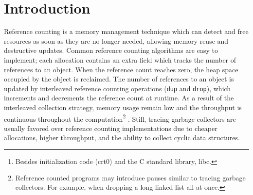 \documentclass[9pt, twocolumn]{article}
\begin{document}
\begin{abstract}
Precise reference counting is a technique by \citeauthor{reinking2021} that uses ownership to deallocate objects as soon as possible. 
The algorithm is called Perceus, and as of this writing, it has only been impl\-emented for eager functional languages.
This paper describes the implementation of a new lazy compiler backend for the Agda programming lang\-uage with precise reference counting.
The compiler uses \citeauthor{johnsson1991} and \citeauthor{boquist1999}'s intermediate language GRIN to compile lazy programs. 
GRIN uses an inter\-procedural \mbox{points-to} analysis to inline the evaluation of suspended computations.
We extend GRIN with a variant of Perceus, and demonstrate the applic\-ability of combining lazy functional programming with precise reference counting by developing a GRIN interpreter and an LLVM IR code generator. 
  Due to GRIN and reference counting, our compiler does not require an external runtime system%
\footnote{Besides initialization code (crt0) and the C standard library, libc.}%
 , which is uncommon for lazy functional languages.%

\end{abstract}

\section{Introduction}

Reference counting \citep{collins1960} is a memory management technique which can detect and free resources as soon as they are no longer needed, allowing memory reuse and destructive updates. 
Common reference counting algorithms are easy to implement; each allocation contains an extra field which tracks the number of references to an object. 
When the reference count reaches zero, the heap space occupied by the object is reclaimed.
The number of references to an object is updated by interleaved reference counting operations (\texttt{dup} and \texttt{drop}), which increments and decrements the reference count at runtime. 
As a result of the interleaved collection strategy, memory usage remain low and the throughput is continuous throughout the computation\footnote{Reference counted programs may introduce pauses similar to tracing garbage collectors. For example, when dropping a long linked list all at once.} \citep{jones1996}.
Still, tracing garbage collectors are usually favored over reference counting implementations due to cheaper allocations, higher throughput, and the ability to collect cyclic data structures.
\end{document}
